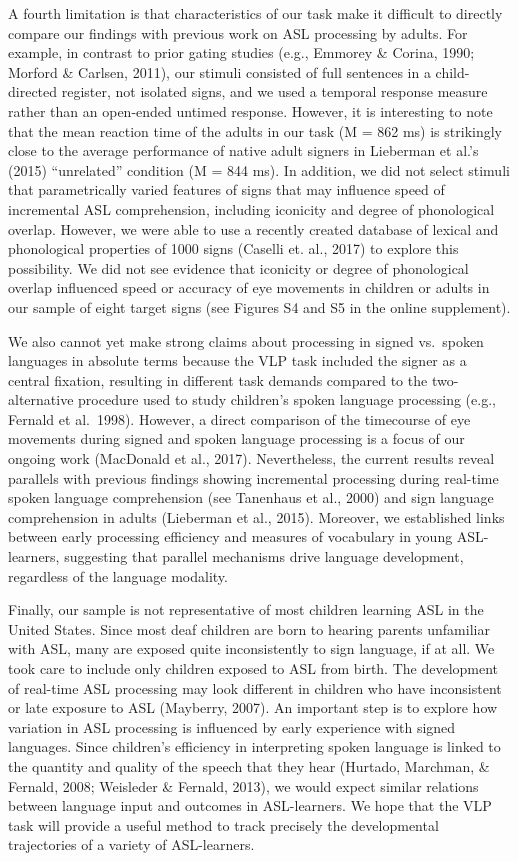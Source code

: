 \documentclass[oneside]{report}
\begin{document}
A fourth limitation is that characteristics of our task make it
difficult to directly compare our findings with previous work on ASL
processing by adults. For example, in contrast to prior gating studies
(e.g., Emmorey \& Corina, 1990; Morford \& Carlsen, 2011), our stimuli
consisted of full sentences in a child-directed register, not isolated
signs, and we used a temporal response measure rather than an open-ended
untimed response. However, it is interesting to note that the mean
reaction time of the adults in our task (M = 862 ms) is strikingly close
to the average performance of native adult signers in Lieberman et al.'s
(2015) ``unrelated'' condition (M = 844 ms). In addition, we did not
select stimuli that parametrically varied features of signs that may
influence speed of incremental ASL comprehension, including iconicity
and degree of phonological overlap. However, we were able to use a
recently created database of lexical and phonological properties of 1000
signs (Caselli et. al., 2017) to explore this possibility. We did not
see evidence that iconicity or degree of phonological overlap influenced
speed or accuracy of eye movements in children or adults in our sample
of eight target signs (see Figures S4 and S5 in the online supplement).

We also cannot yet make strong claims about processing in signed
vs.~spoken languages in absolute terms because the VLP task included the
signer as a central fixation, resulting in different task demands
compared to the two-alternative procedure used to study children's
spoken language processing (e.g., Fernald et al.~1998). However, a
direct comparison of the timecourse of eye movements during signed and
spoken language processing is a focus of our ongoing work (MacDonald et
al., 2017). Nevertheless, the current results reveal parallels with
previous findings showing incremental processing during real-time spoken
language comprehension (see Tanenhaus et al., 2000) and sign language
comprehension in adults (Lieberman et al., 2015). Moreover, we
established links between early processing efficiency and measures of
vocabulary in young ASL-learners, suggesting that parallel mechanisms
drive language development, regardless of the language modality.

Finally, our sample is not representative of most children learning ASL
in the United States. Since most deaf children are born to hearing
parents unfamiliar with ASL, many are exposed quite inconsistently to
sign language, if at all. We took care to include only children exposed
to ASL from birth. The development of real-time ASL processing may look
different in children who have inconsistent or late exposure to ASL
(Mayberry, 2007). An important step is to explore how variation in ASL
processing is influenced by early experience with signed languages.
Since children's efficiency in interpreting spoken language is linked to
the quantity and quality of the speech that they hear (Hurtado,
Marchman, \& Fernald, 2008; Weisleder \& Fernald, 2013), we would expect
similar relations between language input and outcomes in ASL-learners.
We hope that the VLP task will provide a useful method to track
precisely the developmental trajectories of a variety of ASL-learners.
\end{document}
